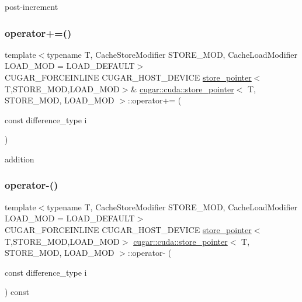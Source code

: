 post-\/increment \mbox{\label{structcugar_1_1cuda_1_1store__pointer_a64108b673ffc7922e87da39b76377216}} 
\subsubsection{\texorpdfstring{operator+=()}{operator+=()}}
{\footnotesize\ttfamily template$<$typename T, Cache\+Store\+Modifier S\+T\+O\+R\+E\+\_\+\+M\+OD, Cache\+Load\+Modifier L\+O\+A\+D\+\_\+\+M\+OD = L\+O\+A\+D\+\_\+\+D\+E\+F\+A\+U\+LT$>$ \\
C\+U\+G\+A\+R\+\_\+\+F\+O\+R\+C\+E\+I\+N\+L\+I\+NE C\+U\+G\+A\+R\+\_\+\+H\+O\+S\+T\+\_\+\+D\+E\+V\+I\+CE \hyperlink{structcugar_1_1cuda_1_1store__pointer}{store\+\_\+pointer}$<$T,S\+T\+O\+R\+E\+\_\+\+M\+OD,L\+O\+A\+D\+\_\+\+M\+OD$>$\& \hyperlink{structcugar_1_1cuda_1_1store__pointer}{cugar\+::cuda\+::store\+\_\+pointer}$<$ T, S\+T\+O\+R\+E\+\_\+\+M\+OD, L\+O\+A\+D\+\_\+\+M\+OD $>$\+::operator+= (\begin{DoxyParamCaption}\item[{const difference\+\_\+type}]{i }\end{DoxyParamCaption})\hspace{0.3cm}{\ttfamily [inline]}}

addition \mbox{\label{structcugar_1_1cuda_1_1store__pointer_a1fbc683ea1005fd2fdd61202aa3532cf}} 
\subsubsection{\texorpdfstring{operator-\/()}{operator-()}\hspace{0.1cm}{\footnotesize\ttfamily [1/2]}}
{\footnotesize\ttfamily template$<$typename T, Cache\+Store\+Modifier S\+T\+O\+R\+E\+\_\+\+M\+OD, Cache\+Load\+Modifier L\+O\+A\+D\+\_\+\+M\+OD = L\+O\+A\+D\+\_\+\+D\+E\+F\+A\+U\+LT$>$ \\
C\+U\+G\+A\+R\+\_\+\+F\+O\+R\+C\+E\+I\+N\+L\+I\+NE C\+U\+G\+A\+R\+\_\+\+H\+O\+S\+T\+\_\+\+D\+E\+V\+I\+CE \hyperlink{structcugar_1_1cuda_1_1store__pointer}{store\+\_\+pointer}$<$T,S\+T\+O\+R\+E\+\_\+\+M\+OD,L\+O\+A\+D\+\_\+\+M\+OD$>$ \hyperlink{structcugar_1_1cuda_1_1store__pointer}{cugar\+::cuda\+::store\+\_\+pointer}$<$ T, S\+T\+O\+R\+E\+\_\+\+M\+OD, L\+O\+A\+D\+\_\+\+M\+OD $>$\+::operator-\/ (\begin{DoxyParamCaption}\item[{const difference\+\_\+type}]{i }\end{DoxyParamCaption}) const\hspace{0.3cm}{\ttfamily [inline]}}

